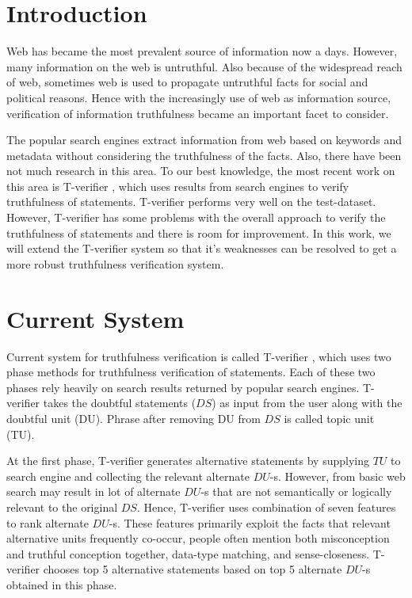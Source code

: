 \documentclass[11pt]{article}
\begin{document}
\section{Introduction}
Web has became the most prevalent source of information now a days. However, many
information on the web is untruthful. Also because of the widespread reach of
web, sometimes web is used to propagate untruthful facts for social and political
reasons. Hence with the increasingly use of web as information source,
verification of information truthfulness became an important facet to consider.

The popular search engines extract information from web based on keywords and
metadata without considering the truthfulness of the facts. Also, there have been
not much research in this area. To our best knowledge, the most recent work on this area is T-verifier  \cite{tverifier}, which uses results from search engines
to verify truthfulness of statements. T-verifier performs very well on the
test-dataset. However, T-verifier has some problems with the overall approach to
verify the truthfulness of statements and there is room for improvement. In this
work, we will extend the T-verifier system so that it's weaknesses can be
resolved to get a more robust truthfulness verification system.


\section{Current System}
Current system for truthfulness verification is called T-verifier
\cite{tverifier}, which uses two phase methods for truthfulness verification of
statements. Each of these two phases rely heavily on search results returned by
popular search engines. T-verifier takes the doubtful statements ($DS$) as input
from the user along with the doubtful unit (DU). Phrase after removing DU from $DS$
is called topic unit (TU).

At the first phase, T-verifier generates alternative statements by supplying
$TU$ to search engine and collecting the relevant alternate $DU$-s. However,
from basic web search may result in lot of alternate $DU$-s that are not semantically or
logically relevant to the original $DS$. Hence, T-verifier uses combination of
seven features to rank alternate $DU$-s. These features primarily exploit the facts
that relevant alternative units frequently co-occur, people often mention both
misconception and truthful conception together, data-type matching, and
sense-closeness. T-verifier chooses top 5 alternative statements based on top 5
alternate $DU$-s obtained in this phase.
\end{document}
